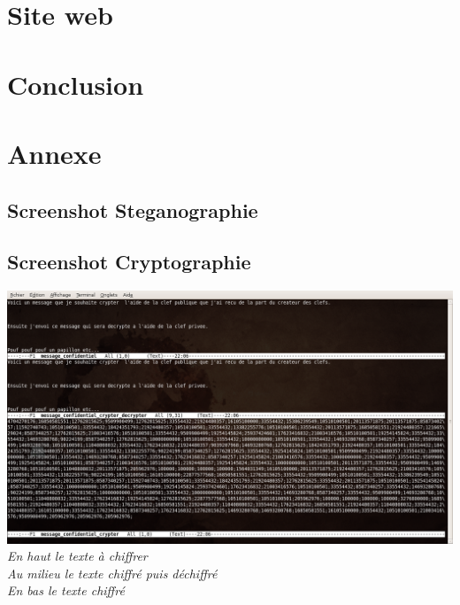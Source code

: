 \documentclass[a4paper,12pt]{article}
\begin{document}
\newpage

\section{Site web}

\newpage

\section{Conclusion}

\newpage

\section{Annexe}

\subsection {Screenshot Steganographie}

\newpage

\begin{landscape}
  \subsection {Screenshot Cryptographie}
  \begin{center}
    \includegraphics[scale=0.42]{cryptage.jpg}\\
    \textit{En haut le texte à chiffrer}\\
    \textit{Au milieu le texte chiffré puis déchiffré}\\
    \textit{En bas le texte chiffré}\\
  \end{center}
\end{landscape}

\newpage
\end{document}
